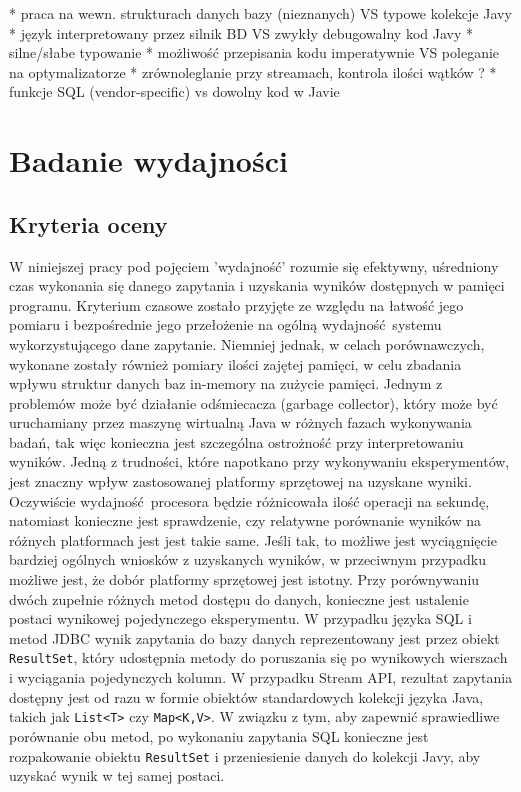 \documentclass[12pt]{extarticle}
\begin{document}
* praca na wewn. strukturach danych bazy (nieznanych) VS typowe kolekcje Javy
* język interpretowany przez silnik BD VS zwykły debugowalny kod Javy
* silne/słabe typowanie
* możliwość przepisania kodu imperatywnie VS poleganie na optymalizatorze
* zrównoleglanie przy streamach, kontrola ilości wątków ?
* funkcje SQL (vendor-specific) vs dowolny kod w Javie
    

\section{Badanie wydajności}

\subsection{Kryteria oceny}

    W niniejszej pracy pod pojęciem 'wydajność' rozumie się efektywny, uśredniony czas wykonania się danego zapytania i uzyskania wyników dostępnych w pamięci programu. Kryterium czasowe zostało przyjęte ze względu na łatwość jego pomiaru i bezpośrednie jego przełożenie na ogólną wydajność systemu wykorzystującego dane zapytanie. Niemniej jednak, w celach porównawczych, wykonane zostały również pomiary ilości zajętej pamięci, w celu zbadania wpływu struktur danych baz in-memory na zużycie pamięci. Jednym z problemów może być działanie odśmiecacza (garbage collector), który może być uruchamiany przez maszynę wirtualną Java w różnych fazach wykonywania badań, tak więc konieczna jest szczególna ostrożność przy interpretowaniu wyników.
    Jedną z trudności, które napotkano przy wykonywaniu eksperymentów, jest znaczny wpływ zastosowanej platformy sprzętowej na uzyskane wyniki. Oczywiście wydajność procesora będzie różnicowała ilość operacji na sekundę, natomiast konieczne jest sprawdzenie, czy relatywne porównanie wyników na różnych platformach jest jest takie same. Jeśli tak, to możliwe jest wyciągnięcie bardziej ogólnych wniosków z uzyskanych wyników, w przeciwnym przypadku możliwe jest, że dobór platformy sprzętowej jest istotny.
    Przy porównywaniu dwóch zupełnie różnych metod dostępu do danych, konieczne jest ustalenie postaci wynikowej pojedynczego eksperymentu. W przypadku języka SQL i metod JDBC wynik zapytania do bazy danych reprezentowany jest przez obiekt \texttt{ResultSet}, który udostępnia metody do poruszania się po wynikowych wierszach i wyciągania pojedynczych kolumn. W przypadku Stream API, rezultat zapytania dostępny jest od razu w formie obiektów standardowych kolekcji języka Java, takich jak \texttt{List<T>} czy \texttt{Map<K,V>}. W związku z tym, aby zapewnić sprawiedliwe porównanie obu metod, po wykonaniu zapytania SQL konieczne jest rozpakowanie obiektu \texttt{ResultSet} i przeniesienie danych do kolekcji Javy, aby uzyskać wynik w tej samej postaci.
\end{document}
